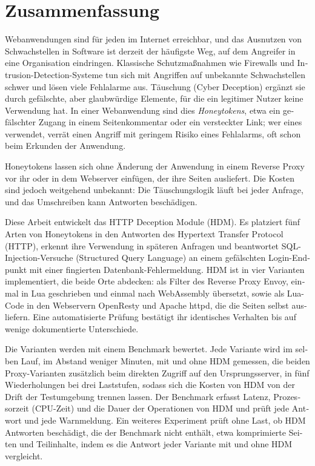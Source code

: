\documentclass{rptuma}
\begin{document}
\chapter*{Zusammenfassung}
\begin{otherlanguage}{german}
Webanwendungen sind für jeden im Internet erreichbar, und das Ausnutzen von Schwachstellen in
Software ist derzeit der häufigste Weg, auf dem Angreifer in eine Organisation eindringen.
Klassische Schutzmaßnahmen wie Firewalls und Intrusion-Detection-Systeme tun sich mit Angriffen auf
unbekannte Schwachstellen schwer und lösen viele Fehlalarme aus. Täuschung (Cyber Deception)
ergänzt sie durch gefälschte, aber glaubwürdige Elemente, für die ein legitimer Nutzer keine
Verwendung hat. In einer Webanwendung sind dies \emph{Honeytokens}, etwa ein
gefälschter Zugang in einem Seitenkommentar oder ein versteckter Link; wer eines verwendet, verrät
einen Angriff mit geringem Risiko eines Fehlalarms, oft schon beim Erkunden der Anwendung.

Honeytokens lassen sich ohne Änderung der Anwendung in einem Reverse Proxy vor ihr oder in dem
Webserver einfügen, der ihre Seiten ausliefert. Die Kosten sind jedoch weitgehend unbekannt: Die
Täuschungslogik läuft bei jeder Anfrage, und das Umschreiben kann Antworten beschädigen.

Diese Arbeit entwickelt das HTTP Deception Module (HDM). Es platziert fünf Arten von Honeytokens in
den Antworten des Hypertext Transfer Protocol (HTTP), erkennt ihre Verwendung in späteren Anfragen
und beantwortet SQL-Injection-Versuche (Structured Query Language) an einem gefälschten
Login-Endpunkt mit einer fingierten Datenbank-Fehlermeldung. HDM ist in vier Varianten
implementiert, die beide Orte abdecken: als Filter des Reverse Proxy Envoy, einmal in Lua
geschrieben und einmal nach WebAssembly übersetzt, sowie als Lua-Code in den Webservern OpenResty und
Apache httpd, die die Seiten selbst ausliefern. Eine automatisierte Prüfung bestätigt ihr
identisches Verhalten bis auf wenige dokumentierte Unterschiede.

Die Varianten werden mit einem Benchmark bewertet. Jede Variante wird im selben Lauf,
im Abstand weniger Minuten, mit und ohne HDM gemessen, die beiden Proxy-Varianten zusätzlich beim
direkten Zugriff auf den Ursprungsserver, in fünf Wiederholungen bei drei Laststufen, sodass sich
die Kosten von HDM von der Drift der Testumgebung trennen lassen. Der Benchmark erfasst Latenz,
Prozessorzeit (CPU-Zeit) und die Dauer der Operationen von HDM und prüft jede Antwort und jede
Warnmeldung. Ein weiteres Experiment prüft ohne Last, ob HDM Antworten beschädigt, die der
Benchmark nicht enthält, etwa komprimierte Seiten und Teilinhalte, indem es die Antwort jeder Variante
mit und ohne HDM vergleicht.


\end{otherlanguage}
\end{document}
